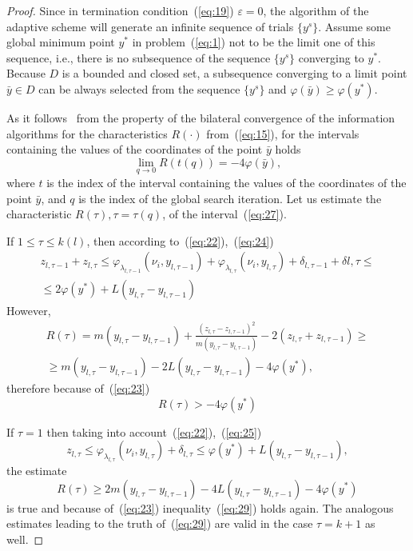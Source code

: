 \documentclass[smallextended]{svjour3}
\let\origref\ref
\renewcommand{\ref}[1]{(\origref{#1})}
\begin{document}
\begin{proof}
Since in termination condition~\ref{eq:19} $\varepsilon = 0$, the algorithm of the adaptive scheme will generate an infinite sequence of trials $\{y^s\}$. Assume some global minimum point $y^*$ in problem~\ref{eq:1} not to be the limit one of this sequence, i.e., there is no subsequence of the sequence $\{y^s\}$ converging to $y^*$. Because $D$ is a bounded and closed set, a subsequence converging to a limit point $\bar{y} \in D$ can be always selected from the sequence $\{y^s\}$ and $\varphi(\bar{y}) \geq \varphi(y^*)$.

As it follows~\cite{Ref36} from the property of the bilateral convergence of the information algorithms for the characteristics $R(\cdot)$ from~\ref{eq:15}, for the intervals containing the values of the coordinates of the point $\bar{y}$ holds
\begin{equation}
\label{eq:28}
\lim_{q \to 0} R(t(q)) = -4\varphi(\bar{y}),
\end{equation}
%
where $t$ is the index of the interval containing the values of the coordinates of the point $\bar{y}$, and $q$ is the index of the global search iteration. Let us estimate the characteristic $R(\tau), \tau = \tau(q)$, of the interval~\ref{eq:27}.

If $1 \leq \tau \leq k(l)$, then according to~\ref{eq:22},~\ref{eq:24}
\begin{multline*}
z_{l, \tau - 1} + z_{l, \tau} \leq \varphi_{\lambda_{l, \tau - 1}}(\nu_i, y_{l, \tau - 1}) + \varphi_{\lambda_{l, \tau}}(\nu_i, y_{l, \tau}) + \delta_{l, \tau - 1} + \delta{l, \tau} \leq \\
\leq 2\varphi(y^*) + L(y_{l, \tau} - y_{l, \tau - 1})
\end{multline*}
%
However,
\begin{multline*}
R(\tau) = m(y_{l, \tau} - y_{l, \tau - 1}) + \frac{(z_{l, \tau} - z_{l, \tau - 1})^2}{m(y_{l, \tau} - y_{l, \tau - 1})} - 2(z_{l, \tau} + z_{l, \tau - 1}) \geq \\
\geq m(y_{l, \tau} - y_{l, \tau - 1}) - 2L(y_{l, \tau} - y_{l, \tau - 1}) - 4\varphi(y^*),
\end{multline*}
%
therefore because of~\ref{eq:23}
\begin{equation}
\label{eq:29}
R(\tau) > -4\varphi(y^*)
\end{equation}

If $\tau = 1$ then taking into account~\ref{eq:22},~\ref{eq:25}
\begin{equation*}
z_{l, \tau} \leq \varphi_{\lambda_{l, \tau}}(\nu_i, y_{l, \tau}) + \delta_{l, \tau} \leq \varphi(y^*) + L(y_{l, \tau} - y_{l, \tau - 1}),
\end{equation*}
%
the estimate
\begin{equation*}
R(\tau) \geq 2m(y_{l, \tau} - y_{l, \tau - 1}) - 4L(y_{l, \tau} - y_{l, \tau - 1}) - 4\varphi(y^*)
\end{equation*}
%
is true and because of~\ref{eq:23} inequality~\ref{eq:29} holds again. The analogous estimates leading to the truth of~\ref{eq:29} are valid in the case $\tau = k + 1$ as well.


\end{proof}
\end{document}

